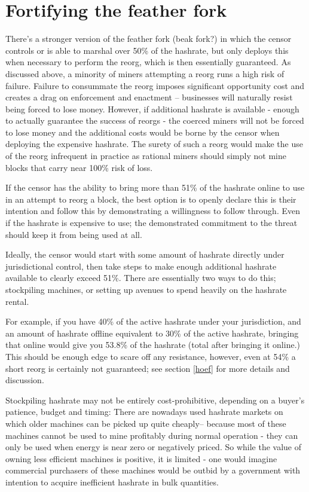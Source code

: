 \documentclass{article}%
\begin{document}
\section{Fortifying\label{fort} the feather fork}

There's a stronger version of the feather fork (beak fork?) in which the
censor controls or is able to marshal over 50\% of the hashrate, but only
deploys this when necessary to perform the reorg, which is then essentially
guaranteed.  As discussed above, a minority of miners attempting a reorg runs
a high risk of failure. Failure to consummate the reorg imposes significant opportunity cost and creates a
drag on enforcement and enactment -- businesses will naturally resist being
forced to lose money.  However, if additional hashrate is available - enough
to actually guarantee the success of reorgs - the coerced miners will not be
forced to lose money and the additional costs would be borne by the censor
when deploying the expensive hashrate. The surety of such a reorg would
make the use of the reorg infrequent in practice as rational miners should simply not
mine blocks that carry near 100\% risk of loss.

If the censor has the ability to bring more than 51\% of the hashrate online
to use in an attempt to reorg a block, the best option is to openly declare this is
their intention and follow this by demonstrating a willingness to follow through.
 Even if the hashrate is expensive to use; the demonstrated commitment to
the threat should keep it from being used at all.

Ideally, the censor would start with some amount of hashrate directly under
jurisdictional control, then take steps to make enough additional hashrate
available to clearly exceed 51\%. There are essentially two ways to do this; stockpiling machines, or setting up
avenues to spend heavily on the hashrate rental.

For example, if you have 40\% of the active hashrate under your jurisdiction,
and an amount of hashrate offline equivalent to 30\% of the active hashrate,
bringing that online would give you 53.8\% of the hashrate (total after bringing it
online.)  This should be enough edge to scare off any resistance, however,
even at 54\% a short reorg is certainly not guaranteed; see section \ref{hoef}
for more details and discussion.

Stockpiling hashrate may not be entirely cost-prohibitive, depending on a
buyer's patience, budget and timing: There are nowadays used hashrate markets on
which older machines can be picked up quite cheaply-- because most of these
machines cannot be used to mine profitably during normal operation - they can
only be used when energy is near zero or negatively priced. So while the value
of owning less efficient machines is positive, it is limited - one would
imagine commercial purchasers of these machines would be outbid by a
government with intention to acquire inefficient hashrate in bulk quantities.
\end{document}
